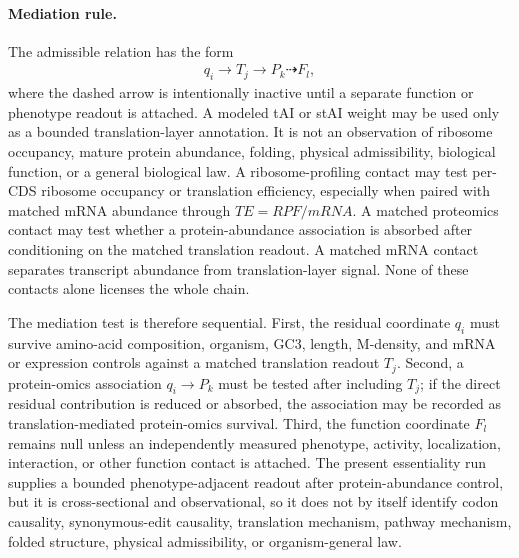 \paragraph{Mediation rule.}
The admissible relation has the form
$$
\begin{aligned}
q_i \longrightarrow T_j \longrightarrow P_k \dashrightarrow F_l,
\end{aligned}
$$
where the dashed arrow is intentionally inactive until a separate function or phenotype readout is attached.  A modeled tAI or stAI weight may be used only as a bounded translation-layer annotation.  It is not an observation of ribosome occupancy, mature protein abundance, folding, physical admissibility, biological function, or a general biological law.  A ribosome-profiling contact may test per-CDS ribosome occupancy or translation efficiency, especially when paired with matched mRNA abundance through $TE=RPF/mRNA$.  A matched proteomics contact may test whether a protein-abundance association is absorbed after conditioning on the matched translation readout.  A matched mRNA contact separates transcript abundance from translation-layer signal.  None of these contacts alone licenses the whole chain.

The mediation test is therefore sequential.  First, the residual coordinate $q_i$ must survive amino-acid composition, organism, GC3, length, M-density, and mRNA or expression controls against a matched translation readout $T_j$.  Second, a protein-omics association $q_i \to P_k$ must be tested after including $T_j$; if the direct residual contribution is reduced or absorbed, the association may be recorded as translation-mediated protein-omics survival.  Third, the function coordinate $F_l$ remains null unless an independently measured phenotype, activity, localization, interaction, or other function contact is attached.  The present essentiality run supplies a bounded phenotype-adjacent readout after protein-abundance control, but it is cross-sectional and observational, so it does not by itself identify codon causality, synonymous-edit causality, translation mechanism, pathway mechanism, folded structure, physical admissibility, or organism-general law.

